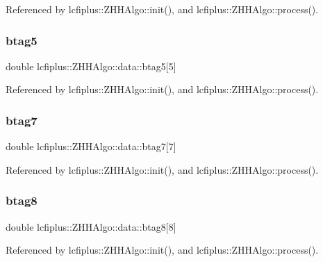 Referenced by lcfiplus\+::\+Z\+H\+H\+Algo\+::init(), and lcfiplus\+::\+Z\+H\+H\+Algo\+::process().

\mbox{\label{structlcfiplus_1_1ZHHAlgo_1_1data_a249901761fcb5fc520d29a1bb18df1db}} 
\subsubsection{btag5}
{\footnotesize\ttfamily double lcfiplus\+::\+Z\+H\+H\+Algo\+::data\+::btag5[5]}



Referenced by lcfiplus\+::\+Z\+H\+H\+Algo\+::init(), and lcfiplus\+::\+Z\+H\+H\+Algo\+::process().

\mbox{\label{structlcfiplus_1_1ZHHAlgo_1_1data_a455c305811b6e000429cd0871c13ce5f}} 
\subsubsection{btag7}
{\footnotesize\ttfamily double lcfiplus\+::\+Z\+H\+H\+Algo\+::data\+::btag7[7]}



Referenced by lcfiplus\+::\+Z\+H\+H\+Algo\+::init(), and lcfiplus\+::\+Z\+H\+H\+Algo\+::process().

\mbox{\label{structlcfiplus_1_1ZHHAlgo_1_1data_a65a8563f056e8d8f40c10694f7837fc5}} 
\subsubsection{btag8}
{\footnotesize\ttfamily double lcfiplus\+::\+Z\+H\+H\+Algo\+::data\+::btag8[8]}



Referenced by lcfiplus\+::\+Z\+H\+H\+Algo\+::init(), and lcfiplus\+::\+Z\+H\+H\+Algo\+::process().

\mbox{\label{structlcfiplus_1_1ZHHAlgo_1_1data_a0a6bad4355f9c330aa2ee667d11bef85}} 
